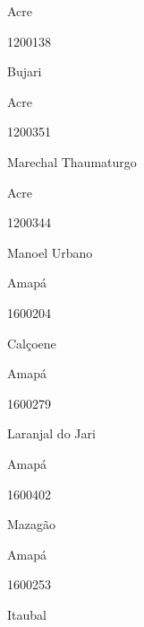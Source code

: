 \documentclass[
  letterpaper,
]{report}
\begin{document}
Acre

\n      

1200138

\n      

Bujari

\n    

\n    

\n      

Acre

\n      

1200351

\n      

Marechal Thaumaturgo

\n    

\n    

\n      

Acre

\n      

1200344

\n      

Manoel Urbano

\n    

\n    

\n      

Amapá

\n      

1600204

\n      

Calçoene

\n    

\n    

\n      

Amapá

\n      

1600279

\n      

Laranjal do Jari

\n    

\n    

\n      

Amapá

\n      

1600402

\n      

Mazagão

\n    

\n    

\n      

Amapá

\n      

1600253

\n      

Itaubal
\end{document}
